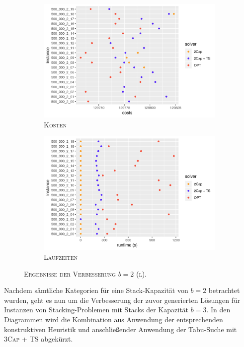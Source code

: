 \begin{figure}[H]
\centering
\begin{subfigure}[b]{0.49\textwidth}
\includegraphics[width=\textwidth]{img/imp_b=2_l_costs.png}
\caption{\textsc{Kosten}}
\label{fig:imp_b=2_l_costs}
\end{subfigure}
\hfill
\begin{subfigure}[b]{0.49\textwidth}
\includegraphics[width=\textwidth]{img/imp_b=2_l_runtimes.png}
\caption{\textsc{Laufzeiten}}
\label{fig:imp_b=2_l_runtimes}
\end{subfigure}
\caption{\textsc{Ergebnisse der Verbesserung $b = 2$ (l)}.}
\label{fig:imp_res_b=2_l}
\end{figure}

Nachdem sämtliche Kategorien für eine Stack-Kapazität von $b = 2$ betrachtet wurden,
geht es nun um die Verbesserung der zuvor generierten Lösungen für Instanzen von Stacking-Problemen
mit Stacks der Kapazität $b = 3$. In den Diagrammen wird die Kombination aus Anwendung der entsprechenden konstruktiven Heuristik und anschließender Anwendung der Tabu-Suche mit \textsc{3Cap + TS} abgekürzt.


